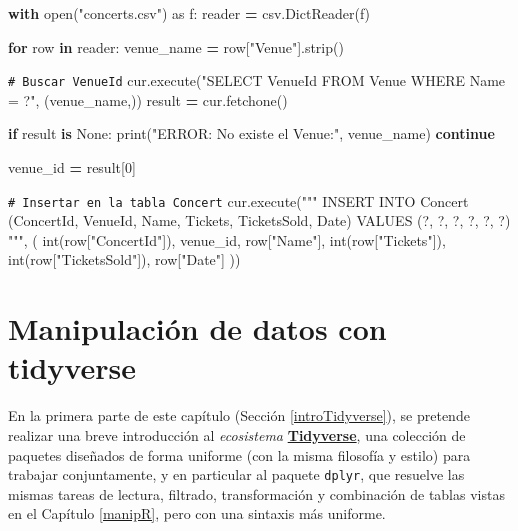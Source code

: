 \documentclass[
]{book}
\newenvironment{Shaded}{\begin{snugshade}}{\end{snugshade}}
\newcommand{\BuiltInTok}[1]{#1}
\newcommand{\CommentTok}[1]{\textcolor[rgb]{0.56,0.35,0.01}{\textit{#1}}}
\newcommand{\ControlFlowTok}[1]{\textcolor[rgb]{0.13,0.29,0.53}{\textbf{#1}}}
\newcommand{\DecValTok}[1]{\textcolor[rgb]{0.00,0.00,0.81}{#1}}
\newcommand{\ImportTok}[1]{#1}
\newcommand{\KeywordTok}[1]{\textcolor[rgb]{0.13,0.29,0.53}{\textbf{#1}}}
\newcommand{\NormalTok}[1]{#1}
\newcommand{\OperatorTok}[1]{\textcolor[rgb]{0.81,0.36,0.00}{\textbf{#1}}}
\newcommand{\StringTok}[1]{\textcolor[rgb]{0.31,0.60,0.02}{#1}}
\newcommand{\VariableTok}[1]{\textcolor[rgb]{0.00,0.00,0.00}{#1}}
\theoremstyle{break}
\theoremstyle{nonumberplain}
\renewcommand{\CommentTok}[1]{\textcolor[rgb]{0.41,0.41,0.41}{\texttt{#1}}}
\begin{document}
\begin{Shaded}
\begin{Highlighting}[]
\ControlFlowTok{with} \BuiltInTok{open}\NormalTok{(}\StringTok{"concerts.csv"}\NormalTok{) }\ImportTok{as}\NormalTok{ f:}
\NormalTok{    reader }\OperatorTok{=}\NormalTok{ csv.DictReader(f)}

    \ControlFlowTok{for}\NormalTok{ row }\KeywordTok{in}\NormalTok{ reader:}
\NormalTok{        venue\_name }\OperatorTok{=}\NormalTok{ row[}\StringTok{"Venue"}\NormalTok{].strip()}

        \CommentTok{\# Buscar VenueId}
\NormalTok{        cur.execute(}\StringTok{"SELECT VenueId FROM Venue WHERE Name = ?"}\NormalTok{, (venue\_name,))}
\NormalTok{        result }\OperatorTok{=}\NormalTok{ cur.fetchone()}

        \ControlFlowTok{if}\NormalTok{ result }\KeywordTok{is} \VariableTok{None}\NormalTok{:}
            \BuiltInTok{print}\NormalTok{(}\StringTok{"ERROR: No existe el Venue:"}\NormalTok{, venue\_name)}
            \ControlFlowTok{continue}

\NormalTok{        venue\_id }\OperatorTok{=}\NormalTok{ result[}\DecValTok{0}\NormalTok{]}

        \CommentTok{\# Insertar en la tabla Concert}
\NormalTok{        cur.execute(}\StringTok{"""}
\StringTok{            INSERT INTO Concert (ConcertId, VenueId, Name, Tickets, TicketsSold, Date)}
\StringTok{            VALUES (?, ?, ?, ?, ?, ?)}
\StringTok{        """}\NormalTok{, (}
            \BuiltInTok{int}\NormalTok{(row[}\StringTok{"ConcertId"}\NormalTok{]),}
\NormalTok{            venue\_id,}
\NormalTok{            row[}\StringTok{"Name"}\NormalTok{],}
            \BuiltInTok{int}\NormalTok{(row[}\StringTok{"Tickets"}\NormalTok{]),}
            \BuiltInTok{int}\NormalTok{(row[}\StringTok{"TicketsSold"}\NormalTok{]),}
\NormalTok{            row[}\StringTok{"Date"}\NormalTok{]}
\NormalTok{        ))}
\end{Highlighting}
\end{Shaded}

\chapter{Manipulación de datos con tidyverse}\label{tidyverse}

En la primera parte de este capítulo (Sección \ref{introTidyverse}), se pretende realizar una breve introducción al \emph{ecosistema} \href{https://dplyr.tidyverse.org}{\textbf{Tidyverse}}, una colección de paquetes diseñados de forma uniforme (con la misma filosofía y estilo) para trabajar conjuntamente, y en particular al paquete \texttt{dplyr}, que resuelve las mismas tareas de lectura, filtrado, transformación y combinación de tablas vistas en el Capítulo \ref{manipR}, pero con una sintaxis más uniforme.
\end{document}
